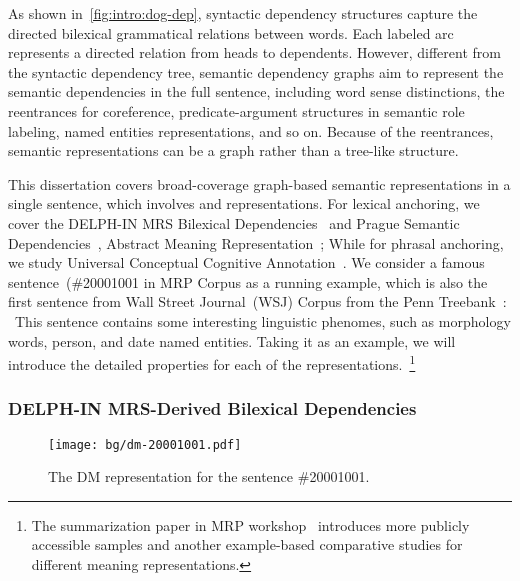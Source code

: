 As shown in~\autoref{fig:intro:dog-dep}, syntactic dependency
structures capture the directed bilexical grammatical relations
between words. Each labeled arc represents a directed relation from
heads to dependents. However, different from the syntactic dependency
tree, semantic dependency graphs aim to represent the semantic
dependencies in the full sentence, including word sense distinctions,
the reentrances for coreference, predicate-argument structures in
semantic role labeling, named entities representations, and so
on. Because of the reentrances, semantic representations can be a
graph rather than a tree-like structure.

This dissertation covers broad-coverage graph-based semantic
representations in a single sentence, which involves
 and  representations. For lexical
anchoring, we cover the DELPH-IN MRS Bilexical
Dependencies~\cite[DM,][]{Iva:Oep:Ovr:12} and Prague Semantic
Dependencies~\cite[PSD,][]{hajic2012announcing,miyao2014house},
Abstract Meaning Representation~\cite[AMR,][]{Ban:Bon:Cai:13}; While
for phrasal anchoring, we study Universal Conceptual Cognitive
Annotation~\cite[UCCA,][]{Abe:Rap:13b}. We consider a famous
sentence~(\#20001001 in MRP Corpus as a running example, which is
also the first sentence from Wall Street Journal~(WSJ) Corpus from the
Penn Treebank~\citep{Mar:San:Mar:93}: \emph{}~This sentence contains some interesting linguistic
phenomes, such as morphology words, person, and date named
entities. Taking it as an example, we will introduce the detailed
properties for each of the representations.~\footnote{The
  summarization paper in MRP workshop~\citep{Mar:San:Mar:93}
  introduces more publicly accessible samples and another example-based comparative studies for different
  meaning representations.}


\subsubsection{DELPH-IN MRS-Derived Bilexical Dependencies}
\label{sssec:bg:dm}

\begin{figure}[!tbp]
\begin{center}
\texttt{[image: bg/dm-20001001.pdf]}
\end{center}
\caption{\label{fig:bg:dm}The DM representation for the sentence
  \#20001001.}
\end{figure}

